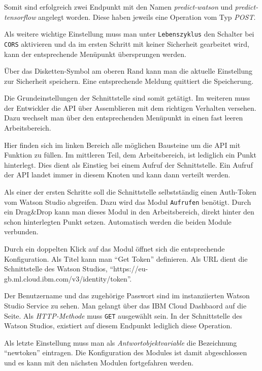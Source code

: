 Somit sind erfolgreich zwei Endpunkt mit den Namen \textit{predict-watson} und \textit{predict-tensorflow} angelegt worden.
Diese haben jeweils eine Operation vom Typ \textit{POST}.

Als weitere wichtige Einstellung muss man unter \texttt{Lebenszyklus} den Schalter bei \texttt{CORS} aktivieren und da
im ersten Schritt mit keiner Sicherheit gearbeitet wird, kann der entsprechende Menüpunkt übersprungen werden.

Über das Disketten-Symbol am oberen Rand kann man die aktuelle Einstellung zur Sicherheit speichern. Eine entsprechende
Meldung quittiert die Speicherung.

Die Grundeinstellungen der Schnittstelle sind somit getätigt. Im weiteren muss der Entwickler die API über Assemblieren
mit dem richtigen Verhalten versehen. Dazu wechselt man über den entsprechenden Menüpunkt in einen fast leeren
Arbeitsbereich.

Hier finden sich im linken Bereich alle möglichen Bausteine um die API mit Funktion zu füllen. Im mittleren Teil, dem
Arbeitsbereich, ist lediglich ein Punkt hinterlegt. Dies dient als Einstieg bei einem Aufruf der Schnittstelle. Ein
Aufruf der API landet immer in diesem Knoten und kann dann verteilt werden.

Als einer der ersten Schritte soll die Schnittstelle selbstständig einen Auth-Token vom Watson Studio abgreifen. Dazu
wird das Modul \texttt{Aufrufen} benötigt. Durch ein Drag\&Drop kann man dieses Modul in den Arbeitsbereich, direkt
hinter den schon hinterlegten Punkt setzen. Automatisch werden die beiden Module verbunden.

Durch ein doppelten Klick auf das Modul öffnet sich die entsprechende Konfiguration. Als Titel kann man \enquote{Get Token}
definieren. Als URL dient die Schnittstelle des Watson Studios, \enquote{https://eu-gb.ml.cloud.ibm.com/v3/identity/token}.

Der Benutzername und das zugehörige Passwort sind im instanziierten Watson Studio Service zu sehen. Man gelangt über das
IBM Cloud Dashbaord auf die Seite. Als \textit{HTTP-Methode} muss \texttt{GET} ausgewählt sein. In der Schnittstelle des
Watson Studios, existiert auf diesem Endpunkt lediglich diese Operation.

Als letzte Einstellung muss man als \textit{Antwortobjektvariable} die Bezeichnung \enquote{newtoken} eintragen. Die
Konfiguration des Modules ist damit abgeschlossen und es kann mit den nächsten Modulen fortgefahren werden.

